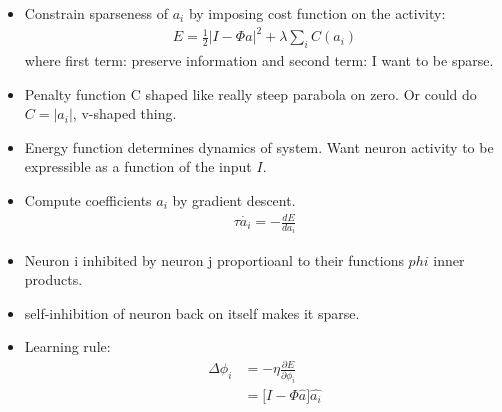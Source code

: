 \documentclass[12pt]{article}
\begin{document}
\begin{itemize}
\begin{itemize}
		\item Constrain sparseness of $a_i$ by imposing cost function on the activity:
		\begin{align}
			E = \frac{1}{2} | I - \Phi a|^2 + \lambda \sum_i C(a_i)
		\end{align}
		where first term: preserve information and second term: I want to be sparse. 
		\item Penalty function C shaped like really steep parabola on zero. Or could do $C = |a_i|$, v-shaped thing. 
		\item Energy function determines dynamics of system. Want neuron activity to be expressible as a function of the input $I$. 
		\item Compute coefficients $a_i$ by gradient descent. 
		\begin{align}
			\tau \dot{a_i} = - \frac{dE}{da_i}
		\end{align}
		\item Neuron i inhibited by neuron j proportioanl to their functions $phi$ inner products. 
		\item self-inhibition of neuron back on itself makes it sparse. 
		\item Learning rule:
		\begin{align}
			\Delta \phi_i &= -\eta \frac{\partial E}{\partial \phi_i} \\
			&= \big[I - \Phi \hat{a} \big] \hat{a_i}
		\end{align}
	\end{itemize}
\end{itemize}
\end{document}
